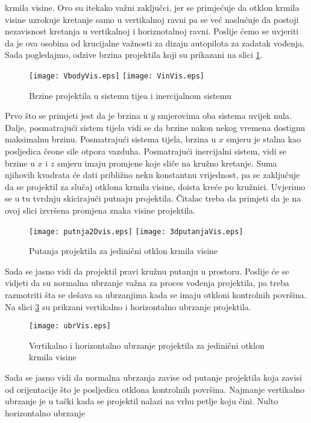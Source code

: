 krmila visine. Ovo su itekako važni zaključci, jer se primjećuje da otklon krmila visine uzrokuje 
kretanje samo u vertikalnoj ravni pa se već naslućuje da postoji nezavisnost kretanja u vertikalnoj i horiznotalnoj 
ravni. Poslije ćemo se uvjeriti da je ova osobina od krucijalne važnosti za dizajn autopilota za zadatak vođenja. 
Sada pogledajmo, odzive brzina projektila koji su prikazani na slici \ref{fig:brzine}.
\begin{figure}[!ht]
    \centering 
    \texttt{[image: VbodyVis.eps]}
    \texttt{[image: VinVis.eps]}
    \caption{Brzine projektila u sistemu tijea i inercijalnom sistemu}
    \label{fig:brzine}
\end{figure}
Prvo što se primjeti jest da je brzina u $y$ smjerovima oba sistema uvijek nula. Dalje, posmatrajući 
sistem tijela vidi se da brzine nakon nekog vremena dostignu maksimalnu brzinu. Posmatrajući
sistema tijela, brzina u $x$ smjeru je stalna kao posljedica čeone sile otpora vazduha. Posmatrajući
inercijalni sistem, vidi se brzine u $x$ i $z$ smjeru imaju promjene koje sliče na kružno kretanje. Suma njihovih kvadrata 
će dati približno neku konstantnu vrijednost, pa se zaključuje da se projektil za slučaj otklona krmila visine, 
doista kreće po kružnici. Uvjerimo se u tu tvrdnju skicirajući putnaju projektila. Čitalac treba 
da primjeti da je na ovoj slici izvršena promjena znaka visine projektila. 
\begin{figure}[!ht]
    \centering 
    \texttt{[image: putnja2Dvis.eps]}
    \texttt{[image: 3dputanjaVis.eps]}
    \caption{Putanja projektila za jedinični otklon krmila visine}
    \label{fig:2dpath}
\end{figure}
Sada se jasno vidi da projektil pravi kružnu putanju u prostoru. 
Poslije će se vidjeti da su normalna ubrzanje važna za proces vođenja projektila, pa treba razmotriti 
šta se dešava sa ubrzanjima kada se imaju otkloni kontrolnih površina. Na slici \ref{fig:ubrVis} su 
prikzani vertikalno i horizontalno ubrzanje projektila.
\begin{figure}[!ht]
    \centering 
    \texttt{[image: ubrVis.eps]}
    \caption{Vertikalno i horizontalno ubrzanje projektila za jedinični otklon krmila visine}
    \label{fig:ubrVis}
\end{figure}
Sada se jasno vidi da normalna ubrzanja zavise od putanje projektila koja zavisi 
od orijentacije što je posljedica otklona kontrolnih površina. Najmanje
vertikalno ubrzanje je u tački kada se projektil nalazi na vrhu petlje koju čini. Nulto horizontalno ubrzanje 
